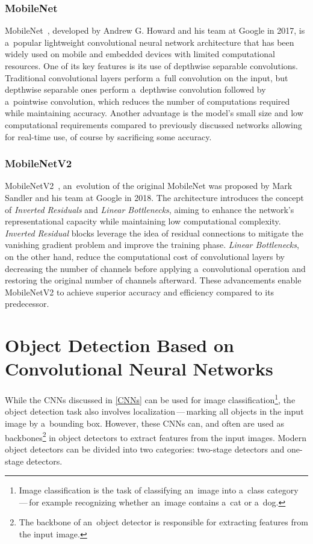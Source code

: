 \subsubsection{MobileNet}

MobileNet~\cite{Howard2017}, developed by Andrew G. Howard and his team at
Google in 2017, is a~popular lightweight convolutional neural network
architecture that has been widely used on mobile and embedded devices with
limited computational resources. One of its key features is its use of depthwise
separable convolutions. Traditional convolutional layers perform a~full
convolution on the input, but depthwise separable ones perform a~depthwise
convolution followed by a~pointwise convolution, which reduces the number of
computations required while maintaining accuracy. Another advantage is the
model's small size and low computational requirements compared to previously
discussed networks allowing for real-time use, of course by sacrificing some
accuracy.


\subsubsection{MobileNetV2}

MobileNetV2~\cite{Sandler2018}, an~evolution of the original MobileNet was
proposed by Mark Sandler and his team at Google in 2018. The architecture
introduces the concept of \textit{Inverted Residuals} and \textit{Linear
Bottlenecks}, aiming to enhance the network's representational capacity while
maintaining low computational complexity. \textit{Inverted Residual} blocks
leverage the idea of residual connections to mitigate the vanishing gradient
problem and improve the training phase. \textit{Linear Bottlenecks}, on the
other hand, reduce the computational cost of convolutional layers by decreasing
the number of channels before applying a~convolutional operation and restoring
the original number of channels afterward. These advancements enable MobileNetV2
to achieve superior accuracy and efficiency compared to its predecessor.


\section{Object Detection Based on Convolutional Neural Networks}

While the CNNs discussed in \autoref{CNNs} can be used for image
classification\footnote{Image classification is the task of classifying an~image
into a~class category\,---\,for example recognizing whether an~image contains
a~cat or a~dog.}, the object detection task also involves
localization\,---\,marking all objects in the input image by a~bounding box.
However, these CNNs can, and often are used as backbones\footnote{The backbone
of an~object detector is responsible for extracting features from the input
image.} in object detectors to extract features from the input images. Modern
object detectors can be divided into two categories: two-stage detectors and
one-stage detectors.

